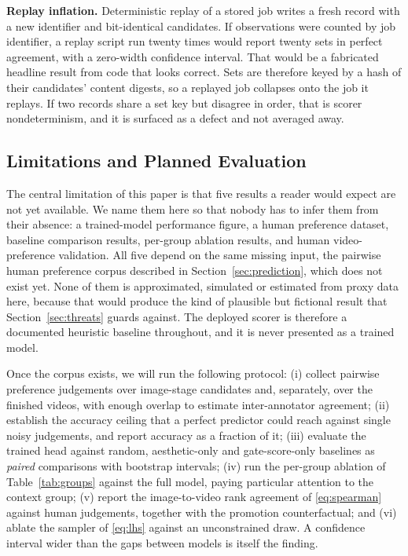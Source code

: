 \documentclass[conference]{IEEEtran}
\begin{document}
\textbf{Replay inflation.} Deterministic replay of a stored job writes a fresh
record with a new identifier and bit-identical candidates. If observations were
counted by job identifier, a replay script run twenty times would report twenty sets
in perfect agreement, with a zero-width confidence interval. That would be a
fabricated headline result from code that looks correct. Sets are therefore keyed by
a hash of their candidates' content digests, so a replayed job collapses onto the
job it replays. If two records share a set key but disagree in order, that is scorer
nondeterminism, and it is surfaced as a defect and not averaged away.

\subsection{Limitations and Planned Evaluation}
\label{sec:limitations}

The central limitation of this paper is that five results a reader would expect are
not yet available. We name them here so that nobody has to infer them from their
absence: a trained-model performance figure, a human preference dataset, baseline
comparison results, per-group ablation results, and human video-preference
validation. All five depend on the same missing input, the pairwise human preference
corpus described in Section~\ref{sec:prediction}, which does not exist yet. None of
them is approximated, simulated or estimated from proxy data here, because that
would produce the kind of plausible but fictional result that
Section~\ref{sec:threats} guards against. The deployed scorer is therefore a
documented heuristic baseline throughout, and it is never presented as a trained
model.

Once the corpus exists, we will run the following protocol: (i) collect pairwise
preference judgements over image-stage candidates and, separately, over the finished
videos, with enough overlap to estimate inter-annotator agreement; (ii) establish
the accuracy ceiling that a perfect predictor could reach against single noisy
judgements, and report accuracy as a fraction of it; (iii) evaluate the trained head
against random, aesthetic-only and gate-score-only baselines as \emph{paired}
comparisons with bootstrap intervals; (iv) run the per-group ablation of
Table~\ref{tab:groups} against the full model, paying particular attention to the
context group; (v) report the image-to-video rank agreement of \eqref{eq:spearman}
against human judgements, together with the promotion counterfactual; and (vi)
ablate the sampler of \eqref{eq:lhs} against an unconstrained draw. A confidence
interval wider than the gaps between models is itself the finding.
\end{document}
